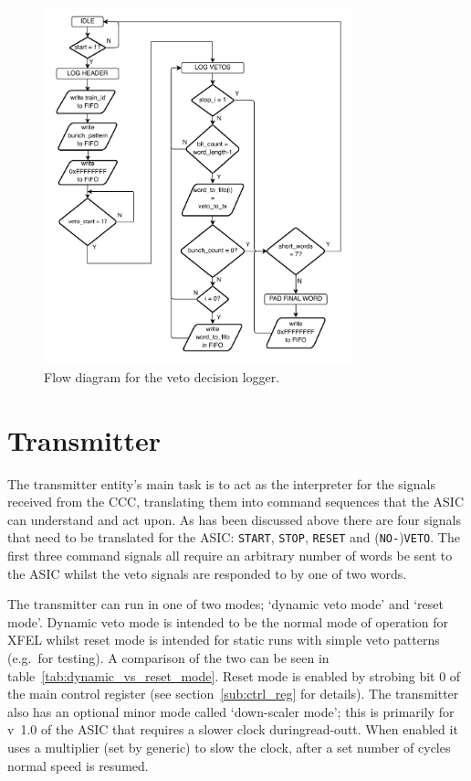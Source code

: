 \begin{figure}[htbp]
  \centering
  \includegraphics[width=0.8\textwidth]{images/pdfs/veto_logger_flow.pdf}
  \caption{Flow diagram for the veto decision logger.}
  \label{fig:veto_logger_flow}
\end{figure}

\section{Transmitter} %
\label{sec:transmitter}
The transmitter entity's main task is to act as the interpreter for the signals received from the CCC, translating them into command sequences that the ASIC can understand and act upon. As has been discussed above there are four signals that need to be translated for the ASIC: \texttt{START}, \texttt{STOP}, \texttt{RESET} and (\texttt{NO-})\texttt{VETO}. The first three command signals all require an arbitrary number of words be sent to the ASIC whilst the veto signals are responded to by one of two words.
    
The transmitter can run in one of two modes; `dynamic veto mode' and `reset mode'. Dynamic veto mode is intended to be the normal mode of operation for XFEL whilst reset mode is intended for static runs with simple veto patterns (e.g.\ for testing). A comparison of the two can be seen in table~\ref{tab:dynamic_vs_reset_mode}. Reset mode is enabled by strobing bit 0 of the main control register (see section~\ref{sub:ctrl_reg} for details). The transmitter also has an optional minor mode called `down-scaler mode'; this is primarily for v~1.0 of the ASIC that requires a slower clock duringread-outt. When enabled it uses a multiplier (set by generic) to slow the clock, after a set number of cycles normal speed is resumed. 
    

